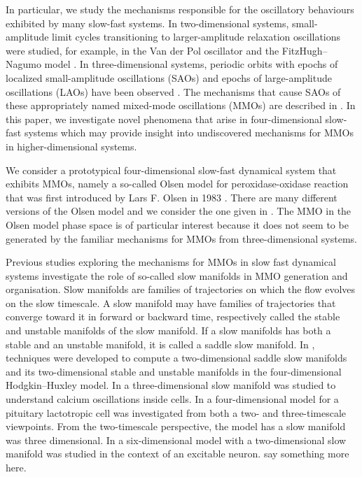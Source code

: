 \documentclass{ws-ijbc}
\begin{document}
In particular, we study the mechanisms responsible for the oscillatory behaviours exhibited by many slow-fast systems.  In two-dimensional systems, small-amplitude limit cycles transitioning to larger-amplitude relaxation oscillations were studied, for example, in the Van der Pol oscillator and the FitzHugh--Nagumo model \cite{canard_explosion, fitz-hugh-nagumo}.  In three-dimensional systems, periodic orbits with epochs of localized small-amplitude oscillations (SAOs) and epochs of large-amplitude oscillations (LAOs) have been observed \cite{BZ}.  The mechanisms that cause SAOs of these appropriately named mixed-mode oscillations (MMOs) are described in \cite{MMO}.  In this paper, we investigate novel phenomena that arise in four-dimensional slow-fast systems which may provide insight into undiscovered mechanisms for MMOs in higher-dimensional systems.

We consider a prototypical four-dimensional slow-fast dynamical system that exhibits MMOs, namely a so-called Olsen model for peroxidase-oxidase reaction that was first introduced by Lars F. Olsen in 1983  \cite{Olsen}.  There are many different versions of the Olsen model and we consider the one given in \cite{Rescaling}.  The MMO in the Olsen model phase space is of particular interest because it does not seem to be generated by the familiar mechanisms for MMOs from three-dimensional systems.

Previous studies exploring the mechanisms for MMOs in slow fast dynamical systems investigate the role of so-called slow manifolds in MMO generation and organisation.  Slow manifolds are families of trajectories on which the flow evolves on the slow timescale.  A slow manifold may have families of trajectories that converge toward it in forward or backward time, respectively called the stable and unstable manifolds of the slow manifold.  If a slow manifolds has both a stable and an unstable manifold, it is called a saddle slow manifold.  In \cite{Cris_paper}, techniques were developed to compute a two-dimensional saddle slow manifolds and its two-dimensional stable and unstable manifolds in the four-dimensional Hodgkin--Huxley model.  In \cite{Emily_Harvey_paper} a three-dimensional slow manifold was studied to understand calcium oscillations inside cells. In \cite{Vo_paper} a four-dimensional model for a pituitary lactotropic cell was investigated from both a two- and three-timescale viewpoints.  From the two-timescale perspective, the model has a slow manifold was three dimensional.  In \cite{Martin_neuron_paper} a six-dimensional model with a two-dimensional slow manifold was studied in the context of an excitable neuron. \cite{Vo_paper2} say something more here.
\end{document}
